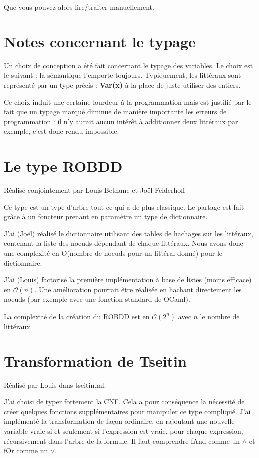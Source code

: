 \documentclass[a4paper,10pt]{article}
\begin{document}
Que vous pouvez alors lire/traiter manuellement.

\section{Notes concernant le typage}
Un choix de conception a été fait concernant le typage des variables. Le choix est le suivant : la sémantique l'emporte toujours.
Typiquement, les littéraux sont représenté par un type précis : \textbf{Var(x)} à la place de juste utiliser des entiers.

Ce choix induit une certaine lourdeur à la programmation mais est justifié par le fait que un typage marqué diminue de manière importante les erreurs de programmation : 
il n'y aurait aucun intérêt à additionner deux littéraux par exemple, c'est donc rendu impossible.

\section{Le type ROBDD}
Réalisé conjointement par Louis Bethune et Joël Felderhoff

Ce type est un type d'arbre tout ce qui a de plus classique. Le partage est fait grâce à un foncteur prenant en paramètre un type de dictionnaire.

J'ai (Joël) réalisé le dictionnaire utilisant des tables de hachages sur les littéraux, contenant la liste des noeuds dépendant de chaque littéraux. Nous avons donc une complexité en O(nombre de noeuds pour un littéral donné) pour le dictionnaire.

J'ai (Louis) factorisé la première implémentation à base de listes (moins efficace) en $\mathcal{O}(n)$.
Une amélioration pourrait être réalisée en hachant directement les noeuds (par exemple avec une fonction standard de OCaml).

La complexité de la création du ROBDD est en $\mathcal{O}(2^n)$ avec $n$ le nombre de littéraux.

\section{Transformation de Tseitin}
Réalisé par Louis dans tseitin.ml.

J'ai choisi de typer fortement la CNF. Cela a pour conséquence la nécessité de créer quelques fonctions supplémentaires pour manipuler ce type compliqué.
J'ai implémenté la transformation de façon ordinaire, en rajoutant une nouvelle variable vraie si et seulement si l'expression est vraie, pour chaque expression, récursivement dans l'arbre de la formule.
Il faut comprendre fAnd comme un $\wedge$ et fOr comme un $\vee$. 
\end{document}

